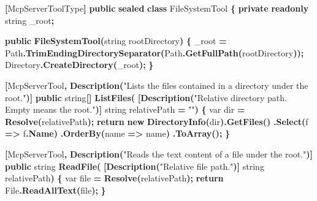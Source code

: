 \documentclass[
  italian,
  10pt,
]{book}
\newenvironment{Shaded}{\begin{snugshade}}{\end{snugshade}}
\newcommand{\DataTypeTok}[1]{\textcolor[rgb]{0.13,0.29,0.53}{#1}}
\newcommand{\FunctionTok}[1]{\textcolor[rgb]{0.13,0.29,0.53}{\textbf{#1}}}
\newcommand{\KeywordTok}[1]{\textcolor[rgb]{0.13,0.29,0.53}{\textbf{#1}}}
\newcommand{\NormalTok}[1]{#1}
\newcommand{\OperatorTok}[1]{\textcolor[rgb]{0.81,0.36,0.00}{\textbf{#1}}}
\newcommand{\StringTok}[1]{\textcolor[rgb]{0.31,0.60,0.02}{#1}}
\begin{document}
\begin{Shaded}
\begin{Highlighting}[]
\OperatorTok{[}\NormalTok{McpServerToolType}\OperatorTok{]}
\KeywordTok{public} \KeywordTok{sealed} \KeywordTok{class}\NormalTok{ FileSystemTool}
\OperatorTok{\{}
    \KeywordTok{private} \KeywordTok{readonly} \DataTypeTok{string}\NormalTok{ \_root}\OperatorTok{;}

    \KeywordTok{public} \FunctionTok{FileSystemTool}\OperatorTok{(}\DataTypeTok{string}\NormalTok{ rootDirectory}\OperatorTok{)}
    \OperatorTok{\{}
\NormalTok{        \_root }\OperatorTok{=}\NormalTok{ Path}\OperatorTok{.}\FunctionTok{TrimEndingDirectorySeparator}\OperatorTok{(}\NormalTok{Path}\OperatorTok{.}\FunctionTok{GetFullPath}\OperatorTok{(}\NormalTok{rootDirectory}\OperatorTok{));}
\NormalTok{        Directory}\OperatorTok{.}\FunctionTok{CreateDirectory}\OperatorTok{(}\NormalTok{\_root}\OperatorTok{);}
    \OperatorTok{\}}

    \OperatorTok{[}\NormalTok{McpServerTool}\OperatorTok{,} \FunctionTok{Description}\OperatorTok{(}\StringTok{"Lists the files contained in a directory under the root."}\OperatorTok{)]}
    \KeywordTok{public} \DataTypeTok{string}\OperatorTok{[]} \FunctionTok{ListFiles}\OperatorTok{(}
        \OperatorTok{[}\FunctionTok{Description}\OperatorTok{(}\StringTok{"Relative directory path. Empty means the root."}\OperatorTok{)]} \DataTypeTok{string}\NormalTok{ relativePath }\OperatorTok{=} \StringTok{""}\OperatorTok{)}
    \OperatorTok{\{}
        \DataTypeTok{var}\NormalTok{ dir }\OperatorTok{=} \FunctionTok{Resolve}\OperatorTok{(}\NormalTok{relativePath}\OperatorTok{);}
        \KeywordTok{return} \KeywordTok{new} \FunctionTok{DirectoryInfo}\OperatorTok{(}\NormalTok{dir}\OperatorTok{).}\FunctionTok{GetFiles}\OperatorTok{()}
            \OperatorTok{.}\FunctionTok{Select}\OperatorTok{(}\NormalTok{f }\OperatorTok{=\textgreater{}}\NormalTok{ f}\OperatorTok{.}\FunctionTok{Name}\OperatorTok{)}
            \OperatorTok{.}\FunctionTok{OrderBy}\OperatorTok{(}\NormalTok{name }\OperatorTok{=\textgreater{}}\NormalTok{ name}\OperatorTok{)}
            \OperatorTok{.}\FunctionTok{ToArray}\OperatorTok{();}
    \OperatorTok{\}}

    \OperatorTok{[}\NormalTok{McpServerTool}\OperatorTok{,} \FunctionTok{Description}\OperatorTok{(}\StringTok{"Reads the text content of a file under the root."}\OperatorTok{)]}
    \KeywordTok{public} \DataTypeTok{string} \FunctionTok{ReadFile}\OperatorTok{(}
        \OperatorTok{[}\FunctionTok{Description}\OperatorTok{(}\StringTok{"Relative file path."}\OperatorTok{)]} \DataTypeTok{string}\NormalTok{ relativePath}\OperatorTok{)}
    \OperatorTok{\{}
        \DataTypeTok{var}\NormalTok{ file }\OperatorTok{=} \FunctionTok{Resolve}\OperatorTok{(}\NormalTok{relativePath}\OperatorTok{);}
        \KeywordTok{return}\NormalTok{ File}\OperatorTok{.}\FunctionTok{ReadAllText}\OperatorTok{(}\NormalTok{file}\OperatorTok{);}
    \OperatorTok{\}}


\end{Highlighting}
\end{Shaded}
\end{document}
